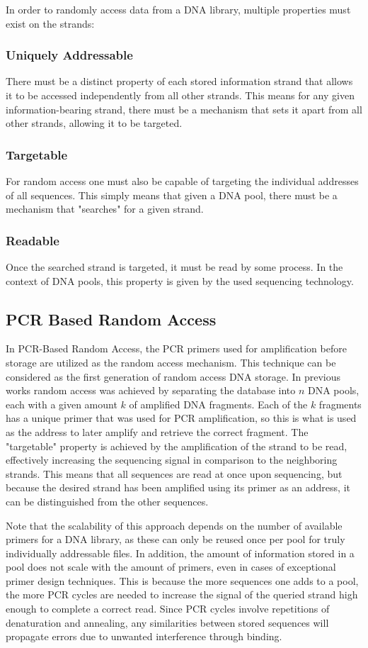 \documentclass[a4paper,conference]{IEEEtran}
\begin{document}
In order to randomly access data from a DNA library, multiple properties must exist on the strands:
\subsubsection{Uniquely Addressable}
There must be a distinct property of each stored information strand that allows it to be accessed independently from all other strands. This means for any given information-bearing strand, there must be a mechanism that sets it apart from all other strands, allowing it to be targeted.
\subsubsection{Targetable}
For random access one must also be capable of targeting the individual addresses of all sequences. This simply means that given a DNA pool, there must be a mechanism that "searches" for a given strand.
\subsubsection{Readable}
Once the searched strand is targeted, it must be read by some process. In the context of DNA pools, this property is given by the used sequencing technology.

\subsection{PCR Based Random Access}
In PCR-Based Random Access, the PCR primers used for amplification before storage are utilized as the random access mechanism. This technique can be considered as the first generation of random access DNA storage. In previous works \cite{} random access was achieved by separating the database into $n$ DNA pools, each with a given amount $k$ of amplified DNA fragments. Each of the $k$ fragments has a unique primer that was used for PCR amplification, so this is what is used as the address to later amplify and retrieve the correct fragment. The "targetable" property is achieved by the amplification of the strand to be read, effectively increasing the sequencing signal in comparison to the neighboring strands. This means that all sequences are read at once upon sequencing, but because the desired strand has been amplified using its primer as an address, it can be distinguished from the other sequences.

Note that the scalability of this approach depends on the number of available primers for a DNA library, as these can only be reused once per pool for truly individually addressable files. In addition, the amount of information stored in a pool does not scale with the amount of primers, even in cases of exceptional primer design techniques. This is because the more sequences one adds to a pool, the more PCR cycles are needed to increase the signal of the queried strand high enough to complete a correct read. Since PCR cycles involve repetitions of denaturation and annealing, any similarities between stored sequences will propagate errors due to unwanted interference through binding.
\end{document}
